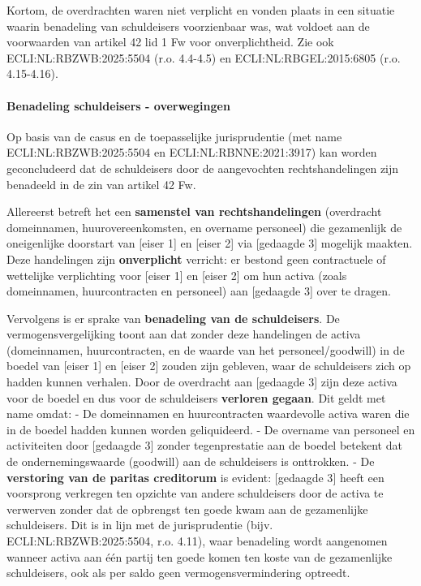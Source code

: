 \documentclass[
  dutch,
  a4paper,
]{article}
\begin{document}
Kortom, de overdrachten waren niet verplicht en vonden plaats in een situatie waarin benadeling van schuldeisers voorzienbaar was, wat voldoet aan de voorwaarden van artikel 42 lid 1 Fw voor onverplichtheid. Zie ook ECLI:NL:RBZWB:2025:5504 (r.o. 4.4-4.5) en ECLI:NL:RBGEL:2015:6805 (r.o. 4.15-4.16).

\paragraph{Benadeling schuldeisers - overwegingen}\label{benadeling-schuldeisers---overwegingen-21}

Op basis van de casus en de toepasselijke jurisprudentie (met name ECLI:NL:RBZWB:2025:5504 en ECLI:NL:RBNNE:2021:3917) kan worden geconcludeerd dat de schuldeisers door de aangevochten rechtshandelingen zijn benadeeld in de zin van artikel 42 Fw.

Allereerst betreft het een \textbf{samenstel van rechtshandelingen} (overdracht domeinnamen, huurovereenkomsten, en overname personeel) die gezamenlijk de oneigenlijke doorstart van {[}eiser 1{]} en {[}eiser 2{]} via {[}gedaagde 3{]} mogelijk maakten. Deze handelingen zijn \textbf{onverplicht} verricht: er bestond geen contractuele of wettelijke verplichting voor {[}eiser 1{]} en {[}eiser 2{]} om hun activa (zoals domeinnamen, huurcontracten en personeel) aan {[}gedaagde 3{]} over te dragen.

Vervolgens is er sprake van \textbf{benadeling van de schuldeisers}. De vermogensvergelijking toont aan dat zonder deze handelingen de activa (domeinnamen, huurcontracten, en de waarde van het personeel/goodwill) in de boedel van {[}eiser 1{]} en {[}eiser 2{]} zouden zijn gebleven, waar de schuldeisers zich op hadden kunnen verhalen. Door de overdracht aan {[}gedaagde 3{]} zijn deze activa voor de boedel en dus voor de schuldeisers \textbf{verloren gegaan}. Dit geldt met name omdat:
- De domeinnamen en huurcontracten waardevolle activa waren die in de boedel hadden kunnen worden geliquideerd.
- De overname van personeel en activiteiten door {[}gedaagde 3{]} zonder tegenprestatie aan de boedel betekent dat de ondernemingswaarde (goodwill) aan de schuldeisers is onttrokken.
- De \textbf{verstoring van de paritas creditorum} is evident: {[}gedaagde 3{]} heeft een voorsprong verkregen ten opzichte van andere schuldeisers door de activa te verwerven zonder dat de opbrengst ten goede kwam aan de gezamenlijke schuldeisers. Dit is in lijn met de jurisprudentie (bijv. ECLI:NL:RBZWB:2025:5504, r.o. 4.11), waar benadeling wordt aangenomen wanneer activa aan één partij ten goede komen ten koste van de gezamenlijke schuldeisers, ook als per saldo geen vermogensvermindering optreedt.
\end{document}
